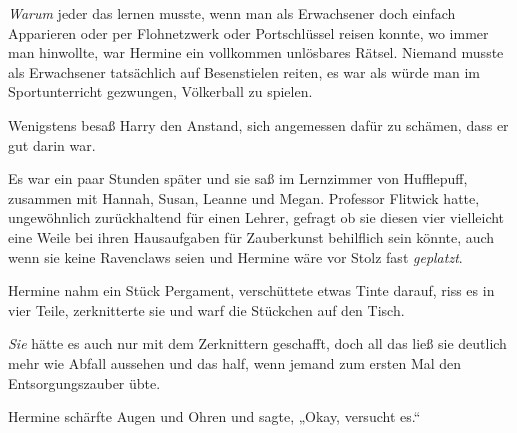 \emph{Warum} jeder das lernen musste, wenn man als Erwachsener doch einfach Apparieren oder per Flohnetzwerk oder Portschlüssel reisen konnte, wo immer man hinwollte, war Hermine ein vollkommen unlösbares Rätsel. Niemand musste als Erwachsener tatsächlich auf Besenstielen reiten, es war als würde man im Sportunterricht gezwungen, Völkerball zu spielen.

Wenigstens besaß Harry den Anstand, sich angemessen dafür zu schämen, dass er gut darin war.

\later

Es war ein paar Stunden später und sie saß im Lernzimmer von Hufflepuff, zusammen mit Hannah, Susan, Leanne und Megan. Professor Flitwick hatte, ungewöhnlich zurückhaltend für einen Lehrer, gefragt ob sie diesen vier vielleicht eine Weile bei ihren Hausaufgaben für Zauberkunst behilflich sein könnte, auch wenn sie keine Ravenclaws seien und Hermine wäre vor Stolz fast \emph{geplatzt}.

Hermine nahm ein Stück Pergament, verschüttete etwas Tinte darauf, riss es in vier Teile, zerknitterte sie und warf die Stückchen auf den Tisch.

\emph{Sie} hätte es auch nur mit dem Zerknittern geschafft, doch all das ließ sie deutlich mehr wie Abfall aussehen und das half, wenn jemand zum ersten Mal den Entsorgungszauber übte.

Hermine schärfte Augen und Ohren und sagte, „Okay, versucht es.“

